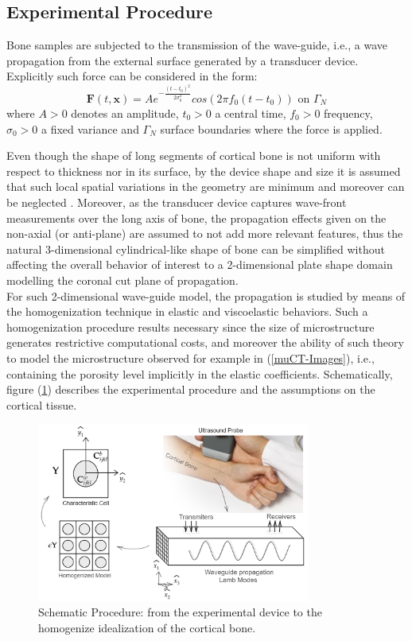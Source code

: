 \subsection{Experimental Procedure}
Bone samples are subjected to the transmission of the wave-guide, i.e., a wave propagation from the external surface generated by a transducer device. 
Explicitly such force can be considered in the form:
\begin{equation*}
    \mathbf{F}(t, \mathbf{x}) = A e^{-\frac{(t-t_0)^2}{2\sigma_0^2}} cos(2 \pi f_0 (t-t_0)) \text{ on } \Gamma_N
\end{equation*}
where $A > 0$ denotes an amplitude, $t_0 > 0$ a central time, $f_0>0$ frequency, $\sigma_0>0$ a fixed variance and $\Gamma_N$ surface boundaries where the force is applied.

Even though the shape of long segments of cortical bone is not uniform with respect to thickness nor in its surface, by the device shape and size it is assumed that such local spatial variations in the geometry are minimum and moreover can be neglected \cite{Foiret2014}. Moreover, as the transducer device captures wave-front measurements over the long axis of bone, the propagation effects given on the non-axial (or anti-plane) are assumed to not add more relevant features, thus the natural 3-dimensional cylindrical-like shape of bone can be simplified without affecting the overall behavior of interest to a 2-dimensional plate shape domain modelling the coronal cut plane of propagation. \\

For such 2-dimensional wave-guide model, the propagation is studied by means of the homogenization technique in elastic and viscoelastic behaviors. Such a homogenization procedure results necessary since the size of microstructure generates restrictive computational costs, and moreover the ability of such theory to model the microstructure observed for example in (\ref{muCT-Images}), i.e., containing the porosity level implicitly in the elastic coefficients.  Schematically, figure (\ref{SchematicProp&Hom}) describes the experimental procedure and the assumptions on the cortical tissue. \\

\begin{figure}[!h]
	\centering
	\includegraphics[width=0.8\textwidth]{images/ImgExt/SchematicPropagation.png}
	\caption{Schematic Procedure: from the experimental device to the homogenize idealization of the cortical bone.}
	\label{SchematicProp&Hom}
\end{figure} 

